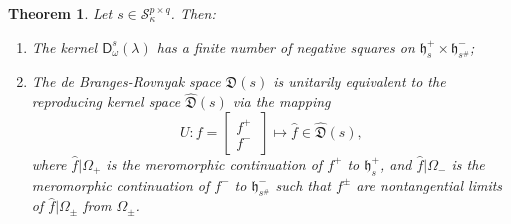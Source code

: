 \documentclass[12pt,twoside,a4paper]{amsart}
\newtheorem{thm}{Theorem}[section]
\theoremstyle{definition}
\numberwithin{equation}{section}
\begin{document}
\begin{thm}\label{DswhDs}
   Let $s\in {\mathcal S}_{\kappa}^{p\times q}$. Then:
\begin{enumerate}
\item[\rm(1)]
The kernel ${\mathsf D}_{\omega}^s(\lambda)$ has a finite number of negative
squares on ${{\mathfrak h}}_{s}^+\times{{\mathfrak h}}_{s^\#}^-$; \vskip 6pt
\item[\rm(2)]
The de Branges-Rovnyak space ${{\mathfrak D}}(s)$ is unitarily equivalent to the
reproducing kernel space ${{{\widehat {{\mathfrak D}}} }}(s)$ via the mapping
\begin{equation}\label{eq:1.300}
  U:f=\begin{bmatrix}
    f^+ \\
    f^- \
  \end{bmatrix}\mapsto {{{\widehat f} }}\in{{{\widehat {{\mathfrak D}}} }}(s),
\end{equation}
where ${{{\widehat f} }}|{\Omega_+}$ is the meromorphic continuation of
$f^+$ to ${{\mathfrak h}}_s^+$, and ${{{\widehat f} }}|{\Omega_-}$ is the meromorphic continuation
of $f^-$ to ${{\mathfrak h}}_{s^\#}^-$ such that $f^\pm$ are nontangential limits
of ${{{\widehat f} }}|{\Omega_\pm}$ from $\Omega_\pm$.
\end{enumerate}
\end{thm}
\end{document}
